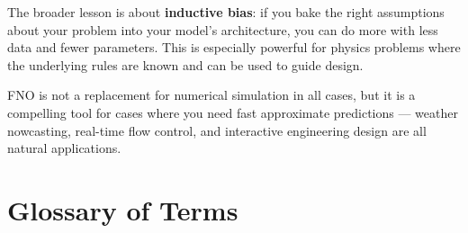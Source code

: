 \documentclass[11pt,twocolumn]{article}
\begin{document}
The broader lesson is about \textbf{inductive bias}: if you bake the right
assumptions about your problem into your model's architecture, you can do more
with less data and fewer parameters.
This is especially powerful for physics problems where the underlying rules are
known and can be used to guide design.

FNO is not a replacement for numerical simulation in all cases, but it is a
compelling tool for cases where you need fast approximate predictions ---
weather nowcasting, real-time flow control, and interactive engineering design
are all natural applications.

\section*{Glossary of Terms}
\end{document}

